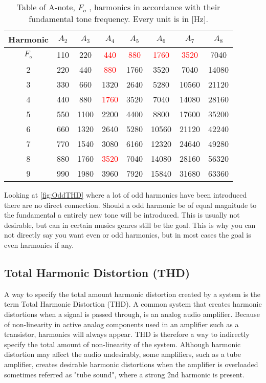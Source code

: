 \begin{table}[H]
\centering
{}
\begin{tabular}{S[table-format=1]ccccccc} \toprule
    {Harmonic} & {$A_2$} & {$A_3$} & {$A_4$} & {$A_5$} & {$A_6$} & {$A_7$} & {$A_8$} \\ \midrule 
    $F_o$  & 110  & 220  & \textcolor{red}{440}   & \textcolor{red}{880}  & \textcolor{red}{1760}  & \textcolor{red}{3520}   & 7040   \\       & 220  & 440  & \textcolor{red}{880}   & 1760 & 3520   & 7040   & 14080  \\ 
    3      & 330  & 660  & 1320  & 2640 & 5280   & 10560  & 21120  \\
    4      & 440  & 880  & \textcolor{red}{1760}  & 3520 & 7040   & 14080  & 28160  \\ 
    5      & 550  & 1100 & 2200  & 4400 & 8800   & 17600  & 35200  \\       & 660  & 1320 & 2640  & 5280 & 10560  & 21120  & 42240  \\
    7      & 770  & 1540 & 3080  & 6160 & 12320  & 24640  & 49280  \\
    8      & 880  & 1760 & \textcolor{red}{3520}  & 7040 & 14080  & 28160  & 56320  \\ 
    9      & 990  & 1980 & 3960  & 7920 & 15840  & 31680  & 63360  \\ \bottomrule
\end{tabular}
\caption{Table of A-note, $F_o$ , harmonics in accordance with their fundamental tone frequency. Every unit is in [Hz].\citep{sou:NoteA}}
\label{tab:NoteA4}
\end{table}

Looking at \autoref{fig:OddTHD} where a lot of odd harmonics have been introduced there are no direct connection. Should a odd harmonic be of equal magnitude to the fundamental a entirely  new tone will be introduced. This is usually not desirable, but can in certain musics genres still be the goal. This is why you can not directly say you want even or odd harmonics, but in most cases the goal is even harmonics if any.

\subsection{Total Harmonic Distortion (THD)}\label{subsec:THDmath}

A way to specify the total amount harmonic distortion created by a system is  the term Total Harmonic Distortion (THD). A common system that creates harmonic distortions when a signal is passed through, is an analog audio amplifier. Because of non-linearity in active analog components used in an amplifier such as a transistor, harmonics will always appear. THD is therefore a way to indirectly specify the total amount of non-linearity of the system. Although harmonic distortion may affect the audio undesirably, some amplifiers, such as a tube amplifier, creates desirable harmonic distortions when the amplifier is overloaded sometimes referred as "tube sound", where a strong 2nd harmonic is present. 


